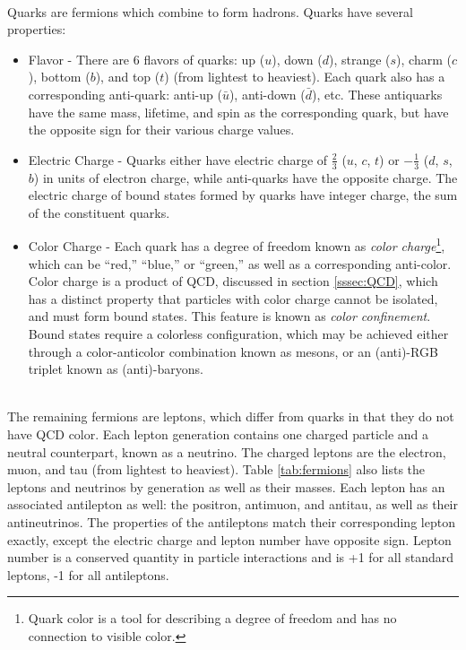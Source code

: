         \\
        \indent Quarks are fermions which combine to form hadrons. Quarks have several properties:
        \begin{itemize}
            \item Flavor - There are 6 flavors of quarks: up ($u$), down ($d$), strange ($s$), charm ($c$), bottom ($b$), and top ($t$) (from lightest to heaviest). Each quark also has a corresponding anti-quark: anti-up ($\bar{u}$), anti-down ($\bar{d}$), etc. These antiquarks have the same mass, lifetime, and spin as the corresponding quark, but have the opposite sign for their various charge values.
            \item Electric Charge - Quarks either have electric charge of $\frac{2}{3}$ ($u$, $c$, $t$) or $-\frac{1}{3}$ ($d$, $s$, $b$) in units of electron charge, while anti-quarks have the opposite charge. The electric charge of bound states formed by quarks have integer charge, the sum of the constituent quarks.
            \item Color Charge - Each quark has a degree of freedom known as \textit{color charge}\footnote{Quark color is a tool for describing a degree of freedom and has no connection to visible color.}, which can be ``red,'' ``blue,'' or ``green,'' as well as a corresponding anti-color. Color charge is a product of \gls{QCD}, discussed in section \ref{sssec:QCD}, which has a distinct property that particles with color charge cannot be isolated, and must form bound states. This feature is known as \textit{color confinement}. Bound states require a colorless configuration, which may be achieved either through a color-anticolor combination known as mesons, or an (anti)-RGB triplet known as (anti)-baryons. 
        \end{itemize}

        \\
        \indent The remaining fermions are leptons, which differ from quarks in that they do not have \gls{QCD} color. Each lepton generation contains one charged particle and a neutral counterpart, known as a neutrino. The charged leptons are the electron, muon, and tau (from lightest to heaviest). Table \ref{tab:fermions} also lists the leptons and neutrinos by generation as well as their masses. Each lepton has an associated antilepton as well: the positron, antimuon, and antitau, as well as their antineutrinos. The properties of the antileptons match their corresponding lepton exactly, except the electric charge and lepton number have opposite sign. Lepton number is a conserved quantity in particle interactions and is +1 for all standard leptons, -1 for all antileptons.

